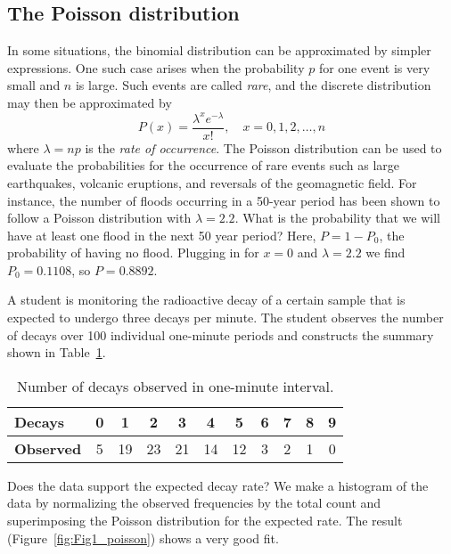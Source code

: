 \subsection{The Poisson distribution}
	In some situations, the binomial distribution can be approximated by simpler expressions.
One such case arises when the probability $p$ for one event is 
very small and $n$ is large.  Such events are called \emph{rare}, and the discrete distribution may then be approximated by 
\begin{equation}
P(x) = \frac{\lambda^x e^{-\lambda}}{x!},\quad x = 0, 1, 2, \ldots, n
\end{equation}
where $\lambda = np$ is the \emph{rate of occurrence}.  The Poisson distribution can be used to evaluate the 
probabilities for the occurrence of rare events such as large earthquakes, volcanic eruptions, and reversals of the 
geomagnetic field.  For instance, the number of floods occurring in a 50-year period has been shown to 
follow a Poisson distribution with $\lambda = 2.2$.  What is the probability that we will have at least 
one flood in the next 50 year period?  Here, $P = 1 - P_0$, the probability of having no flood.  
Plugging in for $x = 0$ and $\lambda = 2.2$ we find $P_0 = 0.1108$, so $P = 0.8892$.
\begin{example}
A student is monitoring the radioactive decay of a certain sample that is expected to
undergo three decays per minute.  The student observes the number of decays over 100
individual one-minute periods and constructs the summary shown in Table~\ref{tbl:decay1}.
\begin{table}[h]
\centering
\begin{tabular}{|l||c|c|c|c|c|c|c|c|c|c|} \hline
\bf{Decays}   & 0 &  1 &  2 &  3 &  4 &  5 & 6 & 7 & 8 & 9 \\ \hline
\bf{Observed} & 5 & 19 & 23 & 21 & 14 & 12 & 3 & 2 & 1 & 0 \\ \hline
\end{tabular}
\caption{Number of decays observed in one-minute interval.}
\label{tbl:decay1}
\end{table}
Does the data support the expected decay rate?  We make a histogram of the data
by normalizing the observed frequencies by the total count
and superimposing the Poisson distribution for the expected rate.  The result (Figure~\ref{fig:Fig1_poisson})
shows a very good fit.	
\end{example}

